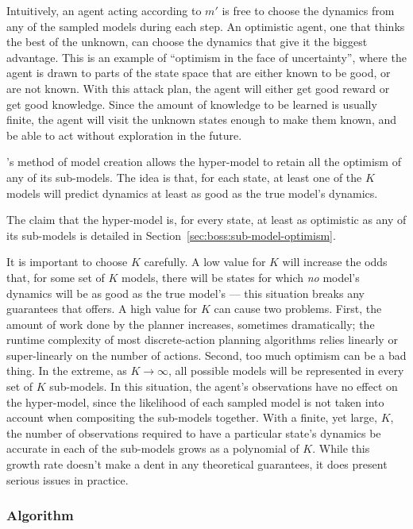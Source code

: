 Intuitively, an agent acting according to $m'$ is free to choose the dynamics from any of the sampled models during each step. An optimistic agent, one that thinks the best of the unknown, can choose the dynamics that give it the biggest advantage. This is an example of ``optimism in the face of uncertainty'', where the agent is drawn to parts of the state space that are either known to be good, or are not known. With this attack plan, the agent will either get good reward or get good knowledge. Since the amount of knowledge to be learned is usually finite, the agent will visit the unknown states enough to make them known, and be able to act without exploration in the future.

's method of model creation allows the hyper-model to retain all the optimism of any of its sub-models. The idea is that, for each state, at least one of the $K$ models will predict dynamics at least as good as the true model's dynamics.

The claim that the hyper-model is, for every state, at least as optimistic as any of its sub-models is detailed in Section~\ref{sec:boss:sub-model-optimism}.

It is important to choose $K$ carefully. A low value for $K$ will increase the odds that, for some set of $K$ models, there will be states for which \emph{no} model's dynamics will be as good as the true model's --- this situation breaks any guarantees that  offers. A high value for $K$ can cause two problems. First, the amount of work done by the planner increases, sometimes dramatically; the runtime complexity of most discrete-action planning algorithms relies linearly or super-linearly on the number of actions. Second, too much optimism can be a bad thing. In the extreme, as $K \rightarrow \infty$, all possible models will be represented in every set of $K$ sub-models. In this situation, the agent's observations have no effect on the hyper-model, since the likelihood of each sampled model is not taken into account when compositing the sub-models together. With a finite, yet large, $K$, the number of observations required to have a particular state's dynamics be accurate in each of the sub-models grows as a polynomial of $K$. While this growth rate doesn't make a dent in any theoretical guarantees, it does present serious issues in practice.

\subsubsection{Algorithm}

